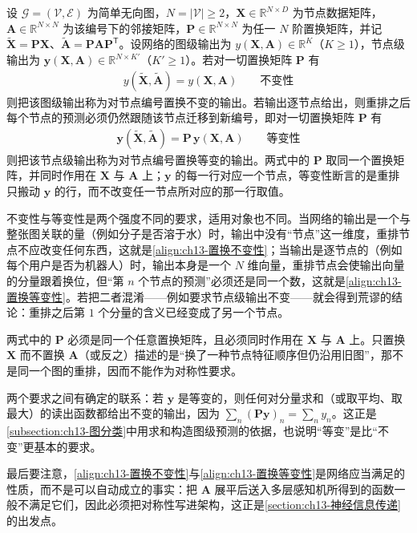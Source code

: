 \documentclass[../../main.tex]{subfiles}
\begin{document}
\begin{definition}[置换不变性与置换等变性]\label{definition:ch13-不变性与等变性}
设 $\mathcal{G}=(\mathcal{V},\mathcal{E})$ 为简单无向图，$N=|\mathcal{V}|\geqslant2$，$\bm{X}\in\mathbb{R}^{N\times D}$ 为节点数据矩阵，$\bm{A}\in\mathbb{R}^{N\times N}$ 为该编号下的邻接矩阵，$\bm{P}\in\mathbb{R}^{N\times N}$ 为任一 $N$ 阶置换矩阵，并记 $\widetilde{\bm{X}}=\bm{P}\bm{X}$、$\widetilde{\bm{A}}=\bm{P}\bm{A}\bm{P}^{\mathsf T}$。设网络的图级输出为 $y(\bm{X},\bm{A})\in\mathbb{R}^{K}$（$K\geqslant1$），节点级输出为 $\bm{y}(\bm{X},\bm{A})\in\mathbb{R}^{N\times K'}$（$K'\geqslant1$）。若对一切置换矩阵 $\bm{P}$ 有
\begin{align}
y(\widetilde{\bm{X}},\widetilde{\bm{A}})=y(\bm{X},\bm{A})\qquad\text{不变性}
\label{align:ch13-置换不变性}
\end{align}
则把该图级输出称为对节点编号置换不变的输出。若输出逐节点给出，则重排之后每个节点的预测必须仍然跟随该节点迁移到新编号，即对一切置换矩阵 $\bm{P}$ 有
\begin{align}
\bm{y}(\widetilde{\bm{X}},\widetilde{\bm{A}})=\bm{P}\,\bm{y}(\bm{X},\bm{A})\qquad\text{等变性}
\label{align:ch13-置换等变性}
\end{align}
则把该节点级输出称为对节点编号置换等变的输出。两式中的 $\bm{P}$ 取同一个置换矩阵，并同时作用在 $\bm{X}$ 与 $\bm{A}$ 上；$\bm{y}$ 的每一行对应一个节点，等变性断言的是重排只搬动 $\bm{y}$ 的行，而不改变任一节点所对应的那一行取值。
\end{definition}

\begin{remark}
不变性与等变性是两个强度不同的要求，适用对象也不同。当网络的输出是一个与整张图关联的量（例如分子是否溶于水）时，输出中没有“节点”这一维度，重排节点不应改变任何东西，这就是\eqref{align:ch13-置换不变性}；当输出是逐节点的（例如每个用户是否为机器人）时，输出本身是一个 $N$ 维向量，重排节点会使输出向量的分量跟着换位，但“第 $n$ 个节点的预测”必须还是同一个数，这就是\eqref{align:ch13-置换等变性}。若把二者混淆——例如要求节点级输出不变——就会得到荒谬的结论：重排之后第 $1$ 个分量的含义已经变成了另一个节点。\par
两式中的 $\bm{P}$ 必须是同一个任意置换矩阵，且必须同时作用在 $\bm{X}$ 与 $\bm{A}$ 上。只置换 $\bm{X}$ 而不置换 $\bm{A}$（或反之）描述的是“换了一种节点特征顺序但仍沿用旧图”，那不是同一个图的重排，因而不能作为对称性要求。\par
两个要求之间有确定的联系：若 $\bm{y}$ 是等变的，则任何对分量求和（或取平均、取最大）的读出函数都给出不变的输出，因为 $\sum_n(\bm{P}\bm{y})_n=\sum_n y_n$。这正是\cref{subsection:ch13-图分类}中用求和构造图级预测的依据，也说明“等变”是比“不变”更基本的要求。\par
最后要注意，\eqref{align:ch13-置换不变性}与\eqref{align:ch13-置换等变性}是网络应当满足的性质，而不是可以自动成立的事实：把 $\bm{A}$ 展平后送入多层感知机所得到的函数一般不满足它们，因此必须把对称性写进架构，这正是\cref{section:ch13-神经信息传递}的出发点。
\end{remark}
\end{document}
